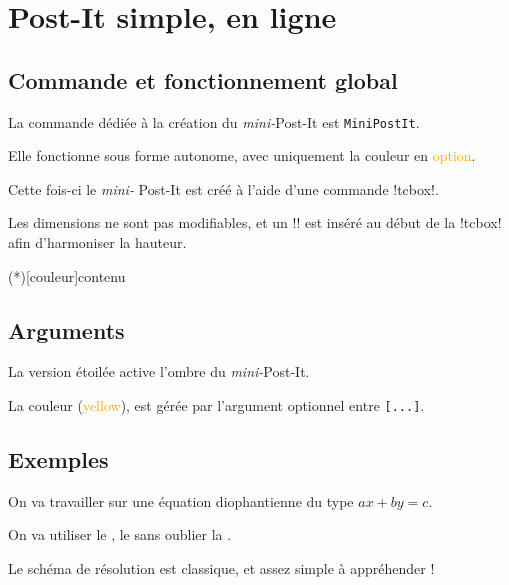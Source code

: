 \documentclass[french,a4paper,11pt]{article}
\newcommand\Cle[1]{{\small\sffamily\textlangle \textcolor{orange}{#1}\textrangle}}
\begin{document}
\pagebreak

\section{Post-It simple, en ligne}

\subsection{Commande et fonctionnement global}

\begin{cautionblock}
La commande dédiée à la création du \textit{mini-}Post-It est \texttt{MiniPostIt}.

Elle fonctionne sous forme autonome, avec uniquement la couleur en \Cle{option}.

\smallskip

Cette fois-ci le \textit{mini-} Post-It est créé à l'aide d'une commande \motcletex!tcbox!.

\smallskip

Les dimensions ne sont pas modifiables, et un \motcletex!\vphantom! est inséré au début de la \motcletex!tcbox! afin d'harmoniser la hauteur.
\end{cautionblock}

\begin{DemoCode}
\MiniPostIt(*)[couleur]{contenu}
\end{DemoCode}

\subsection{Arguments}

\begin{noteblock}
La version étoilée active l'ombre du \textit{mini-}Post-It.

La couleur (\Cle{yellow}), est gérée par l'argument optionnel entre \texttt{[...]}.
\end{noteblock}

\subsection{Exemples}

\begin{DemoCode}[]
On va travailler sur une équation diophantienne du type $ax+by=c$.

On va utiliser le , le  sans oublier la .

Le schéma de résolution est classique, et assez simple à appréhender !
\end{DemoCode}
\end{document}
